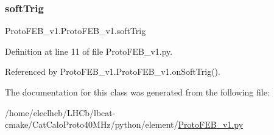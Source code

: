 \subsubsection{\texorpdfstring{soft\+Trig}{softTrig}}
{\footnotesize\ttfamily Proto\+F\+E\+B\+\_\+v1.\+Proto\+F\+E\+B\+\_\+v1.\+soft\+Trig}



Definition at line 11 of file Proto\+F\+E\+B\+\_\+v1.\+py.



Referenced by Proto\+F\+E\+B\+\_\+v1.\+Proto\+F\+E\+B\+\_\+v1.\+on\+Soft\+Trig().



The documentation for this class was generated from the following file\+:\begin{DoxyCompactItemize}
\item 
/home/eleclhcb/\+L\+H\+Cb/lbcat-\/cmake/\+Cat\+Calo\+Proto40\+M\+Hz/python/element/\hyperlink{ProtoFEB__v1_8py}{Proto\+F\+E\+B\+\_\+v1.\+py}\end{DoxyCompactItemize}
